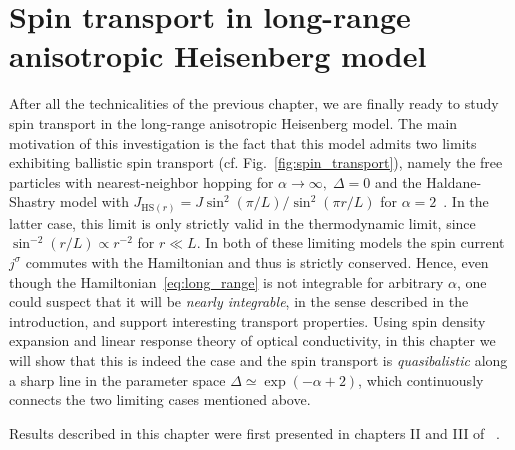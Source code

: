 \chapter{Spin transport in long-range anisotropic Heisenberg model\label{chap:spin_transport}}
\thispagestyle{chapterBeginStyle}

After all the technicalities of the previous chapter, we are finally ready to study spin transport in
the long-range anisotropic Heisenberg model. The main motivation of this investigation is the fact that this model admits 
two limits exhibiting ballistic spin transport (cf. Fig.~\ref{fig:spin_transport}), namely the free particles
with nearest-neighbor hopping for \(\alpha\to \infty,\; \Delta = 0\) and the Haldane-Shastry
model with \(J_{\mathrm{HS}(r)} = J \sin^2\left(\pi/L\right)/\sin^2\left(\pi r/L\right)\)
 for \(\alpha = 2\)~\autocite{Haldane1988,Shastry1988}. In the latter case, this limit is only strictly valid
 in the thermodynamic limit, since \(\sin^{-2}\left(r/L\right)\propto r^{-2}\) for \(r \ll L\).
 In both of these limiting models the spin current 
\(j^{\sigma}\) commutes with the Hamiltonian and thus is strictly conserved. Hence, even though
the Hamiltonian~\eqref{eq:long_range} is not integrable for arbitrary \(\alpha\), one could suspect
that it will be \textit{nearly integrable}, in the sense described in the introduction, and support
interesting transport properties. Using spin density expansion and linear response theory
of optical conductivity, in this chapter we will show that this is indeed the case and the spin transport is \textit{quasibalistic} along a sharp
line in the parameter space \(\Delta \simeq \exp(- \alpha + 2)\), which continuously connects the two limiting
cases mentioned above.

Results described in this chapter were first presented in chapters II and III of ~\textcite{Mierzejewski2023}.


